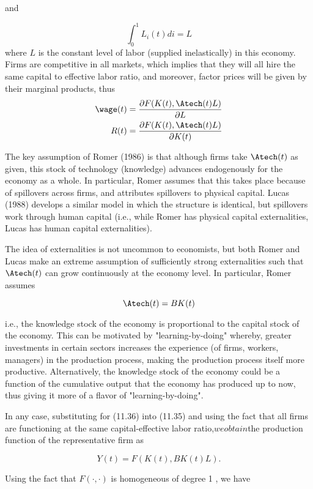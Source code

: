 \documentclass[\topdir/lecture\_notes.tex]{subfiles}
\begin{document}
and

\[
\int_{0}^{1} L_{i}(t) d i=L
\]
where $L$ is the constant level of labor (supplied inelastically) in this economy. Firms are competitive in all markets, which implies that they will all hire the same capital to effective labor ratio, and moreover, factor prices will be given by their marginal products, thus
\begin{equation}
\begin{aligned}
\wage(t) & =\frac{\partial F(K(t), \Atech(t) L)}{\partial L} \\
R(t) & =\frac{\partial F(K(t), \Atech(t) L)}{\partial K(t)}
\end{aligned}
\end{equation}

The key assumption of Romer (1986) is that although firms take $\Atech(t)$ as given, this stock of technology (knowledge) advances endogenously for the economy as a whole. In particular, Romer assumes that this takes place because of spillovers across firms, and attributes spillovers to physical capital. Lucas (1988) develops a similar model in which the structure is identical, but spillovers work through human capital (i.e., while Romer has physical capital externalities, Lucas has human capital externalities).

The idea of externalities is not uncommon to economists, but both Romer and Lucas make an extreme assumption of sufficiently strong externalities such that $\Atech(t)$ can grow continuously at the economy level. In particular, Romer assumes

\[
\Atech(t)=B K(t)
\]

i.e., the knowledge stock of the economy is proportional to the capital stock of the economy. This can be motivated by "learning-by-doing" whereby, greater investments in certain sectors increases the experience (of firms, workers, managers) in the production process, making the production process itself more productive. Alternatively, the knowledge stock of the economy could be a function of the cumulative output that the economy has produced up to now, thus giving it more of a flavor of "learning-by-doing".

In any case, substituting for (11.36) into (11.35) and using the fact that all firms are functioning at the same capital-effective labor ratio,$ we obtain $the production function of the representative firm as

\[
Y(t)=F(K(t), B K(t) L) .
\]

Using the fact that $F(\cdot, \cdot)$ is homogeneous of degree 1 , we have
\end{document}
